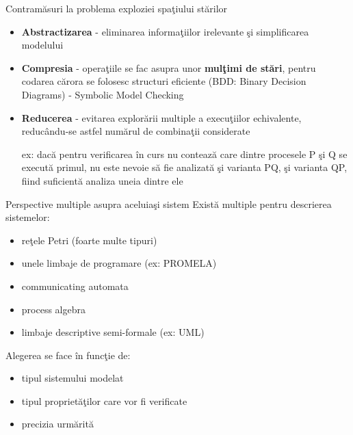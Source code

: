 \documentclass{beamer}
\begin{document}
\begin{frame}{Contramăsuri la problema exploziei spaţiului stărilor}
\begin{itemize}
\item
\textbf{Abstractizarea} - eliminarea informaţiilor irelevante şi simplificarea modelului
\item
\textbf{Compresia} - operaţiile se fac asupra unor \textbf{mulţimi de stări}, pentru codarea cărora se folosesc structuri eficiente (BDD: Binary Decision Diagrams) - Symbolic Model Checking
\item
\textbf{Reducerea} - evitarea explorării multiple a execuţiilor echivalente, reducându-se astfel numărul de combinaţii considerate

ex: dacă pentru verificarea în curs nu contează care dintre procesele P şi Q se execută primul, nu este nevoie să fie analizată şi varianta PQ, şi varianta QP, fiind suficientă analiza uneia dintre ele
\end{itemize}
\end{frame}



\begin{frame}{Perspective multiple asupra aceluiaşi sistem}
Există multiple pentru descrierea sistemelor:
\begin{itemize}
\item
reţele Petri (foarte multe tipuri)
\item
unele limbaje de programare (ex: PROMELA)
\item
communicating automata
\item
process algebra
\item
limbaje descriptive semi-formale (ex: UML)
\end{itemize}

\vspace{0.5cm}

Alegerea se face în funcţie de:
\begin{itemize}
\item
tipul sistemului modelat
\item
tipul proprietăţilor care vor fi verificate
\item
precizia urmărită
\end{itemize}
\end{frame}
\end{document}
